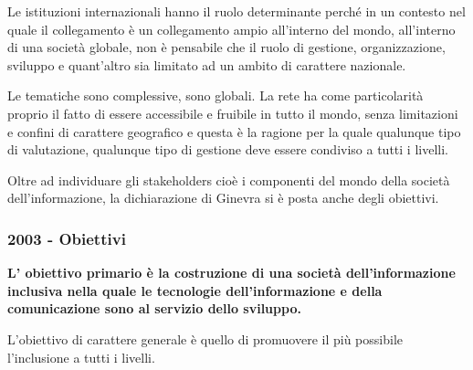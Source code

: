 Le istituzioni internazionali hanno il ruolo determinante perché in un contesto nel quale il collegamento è un collegamento ampio all'interno del mondo, all'interno di una società globale, non è pensabile che il ruolo di gestione, organizzazione, sviluppo e quant'altro sia limitato ad un ambito di carattere nazionale.

Le tematiche sono complessive, sono globali. La rete ha come particolarità proprio il fatto di essere accessibile e fruibile in tutto il mondo, senza limitazioni e confini di carattere geografico e questa è la ragione per la quale qualunque tipo di valutazione, qualunque tipo di gestione deve essere condiviso a tutti i livelli.

Oltre ad individuare gli stakeholders cioè i componenti del mondo della società dell'informazione, la dichiarazione di Ginevra si è posta anche degli obiettivi. \par

\subsubsection{2003 - Obiettivi}

\textbf{L' obiettivo primario è la costruzione di una società dell'informazione inclusiva nella quale le tecnologie dell'informazione e della comunicazione sono al servizio dello sviluppo.}

L'obiettivo di carattere generale è quello di promuovere il più possibile l'inclusione a tutti i livelli.

